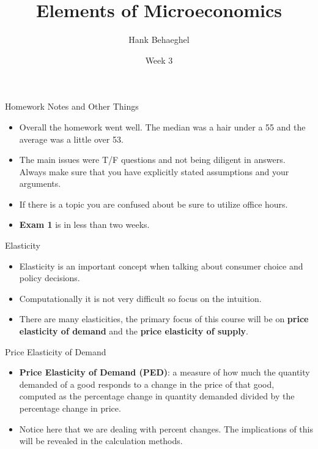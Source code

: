 \documentclass[aspectratio=169]{beamer}
\title{Elements of Microeconomics}
\author{Hank Behaeghel}
\institute{Johns Hopkins University}
\date{Week 3}
\begin{document}
\maketitle

\begin{frame}{Homework Notes and Other Things}
    \begin{itemize}
    \item Overall the homework went well. The median was a hair under a 55 and the average was a little over 53.
    \item The main issues were T/F questions and not being diligent in answers. Always make sure that you have explicitly stated assumptions and your arguments.
    \item If there is a topic you are confused about be sure to utilize office hours.
    \item \textbf{Exam 1} is in less than two weeks. 
    \end{itemize}

\end{frame}

\begin{frame}{Elasticity}
    \begin{itemize}
        \item Elasticity is an important concept when talking about consumer choice and policy decisions.
        \item Computationally it is not very difficult so focus on the intuition.
        \item There are many elasticities, the primary focus of this course will be on \textbf{price elasticity of demand} and the \textbf{price elasticity of supply}.
    \end{itemize}
\end{frame}

\begin{frame}{Price Elasticity of Demand}
    \begin{itemize}
        \item<1-> \textbf{Price Elasticity of Demand (PED)}: a measure of how much the quantity demanded of a good responds to a change in the price of
        that good, computed as the percentage change in quantity demanded
        divided by the percentage change in price.
        \vspace{5mm}
        \item Notice here that we are dealing with percent changes. The implications of this will be revealed in the calculation methods.
    \end{itemize}
\end{frame}
\end{document}
